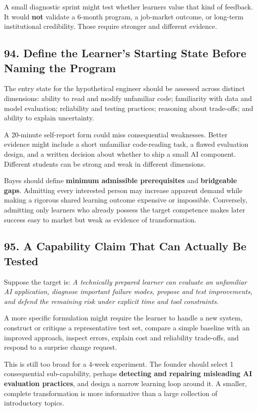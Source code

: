 A small diagnostic sprint might test whether learners value that kind of feedback. It would \textbf{not} validate a 6-month program, a job-market outcome, or long-term institutional credibility. Those require stronger and different evidence.

\subsection*{94. Define the Learner's Starting State Before Naming the Program}

The entry state for the hypothetical engineer should be assessed across distinct dimensions: ability to read and modify unfamiliar code; familiarity with data and model evaluation; reliability and testing practices; reasoning about trade-offs; and ability to explain uncertainty.

A 20-minute self-report form could miss consequential weaknesses. Better evidence might include a short unfamiliar code-reading task, a flawed evaluation design, and a written decision about whether to ship a small AI component. Different students can be strong and weak in different dimensions.

Bayes should define \textbf{minimum admissible prerequisites} and \textbf{bridgeable gaps}. Admitting every interested person may increase apparent demand while making a rigorous shared learning outcome expensive or impossible. Conversely, admitting only learners who already possess the target competence makes later success easy to market but weak as evidence of transformation.

\subsection*{95. A Capability Claim That Can Actually Be Tested}

Suppose the target is: \emph{A technically prepared learner can evaluate an unfamiliar AI application, diagnose important failure modes, propose and test improvements, and defend the remaining risk under explicit time and tool constraints.}

A more specific formulation might require the learner to handle a new system, construct or critique a representative test set, compare a simple baseline with an improved approach, inspect errors, explain cost and reliability trade-offs, and respond to a surprise change request.

This is still too broad for a 4-week experiment. The founder should select 1 consequential sub-capability, perhaps \textbf{detecting and repairing misleading AI evaluation practices}, and design a narrow learning loop around it. A smaller, complete transformation is more informative than a large collection of introductory topics.

